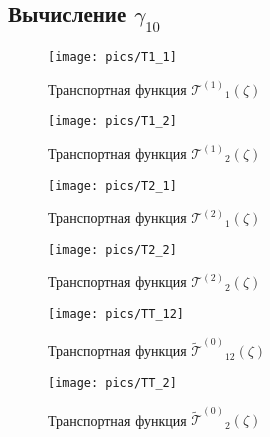 \documentclass[a4paper,12pt]{article}
\newcommand{\T}[1]{\ensuremath{\mathcal{T}^{(#1)}}}
\newcommand{\TT}{\ensuremath{\tilde{\mathcal{T}}^{(0)}}}
\begin{document}
\subsection{Вычисление \texorpdfstring{$\gamma_{10}$}{gamma10}}

\begin{figure}
    \centering
    \begin{minipage}[b]{0.5\textwidth}
        \centering
        \texttt{[image: pics/T1\_1]}
        \caption{Транспортная функция \(\T{1}_1(\zeta)\)}
        \label{fig:T1_1}
    \end{minipage}%
    \begin{minipage}[b]{0.5\textwidth}
        \centering
        \texttt{[image: pics/T1\_2]}
        \caption{Транспортная функция \(\T{1}_2(\zeta)\)}
        \label{fig:T1_2}
    \end{minipage}
\end{figure}

\begin{figure}
    \centering
    \begin{minipage}[b]{0.5\textwidth}
        \centering
        \texttt{[image: pics/T2\_1]}
        \caption{Транспортная функция \(\T{2}_1(\zeta)\)}
        \label{fig:T2_1}
    \end{minipage}%
    \begin{minipage}[b]{0.5\textwidth}
        \centering
        \texttt{[image: pics/T2\_2]}
        \caption{Транспортная функция \(\T{2}_2(\zeta)\)}
        \label{fig:T2_2}
    \end{minipage}
\end{figure}

\begin{figure}
    \centering
    \begin{minipage}[b]{0.5\textwidth}
        \centering
        \texttt{[image: pics/TT\_12]}
        \caption{Транспортная функция \(\TT_{12}(\zeta)\)}
        \label{fig:TT12}
    \end{minipage}%
    \begin{minipage}[b]{0.5\textwidth}
        \centering
        \texttt{[image: pics/TT\_2]}
        \caption{Транспортная функция \(\TT_2(\zeta)\)}
        \label{fig:TT2}
    \end{minipage}
\end{figure}
\end{document}
